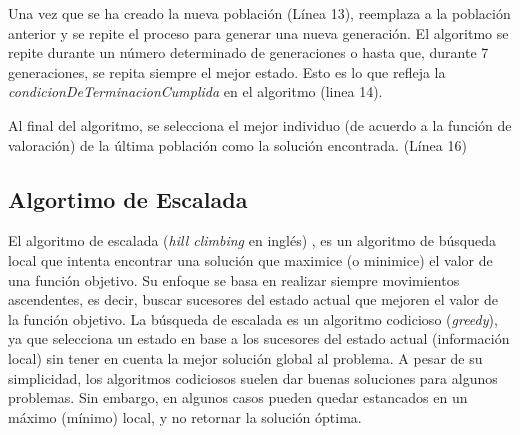 Una vez que se ha creado la nueva población (Línea 13), reemplaza a la población anterior y se repite el proceso para generar una nueva generación. 
El algoritmo se repite durante un número determinado de generaciones o hasta que, durante 7 generaciones, se repita siempre el mejor estado. Esto es lo que refleja la \emph{condicionDeTerminacionCumplida}
en el algoritmo (linea 14).

Al final del algoritmo, se selecciona el mejor individuo (de acuerdo a la función de valoración) de la última población como la solución encontrada. (Línea 16)



\subsection{Algortimo de Escalada}
\label{alg:approachHC}

El algoritmo de escalada (\emph{hill climbing} en inglés) \cite{Russell:2009, Cormen2009, kleinberg2006}, es un algoritmo de búsqueda local que intenta encontrar una solución que maximice (o minimice) el valor de una función objetivo. Su enfoque se basa en realizar siempre movimientos ascendentes, es decir, buscar sucesores del estado actual que mejoren el valor de la función objetivo. La búsqueda de escalada es un algoritmo codicioso (\emph{greedy}), ya que selecciona un estado en base a los sucesores del estado actual (información local) sin tener en cuenta la mejor solución global al problema. A pesar de su simplicidad, los algoritmos codiciosos suelen dar buenas soluciones para algunos problemas. Sin embargo, en algunos casos pueden quedar estancados en un máximo (mínimo) local, y no retornar la solución óptima.

